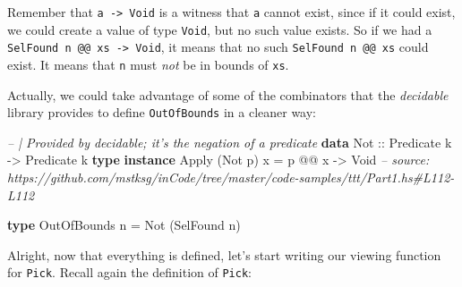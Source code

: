 \documentclass[]{article}
\newenvironment{Shaded}{}{}
\newcommand{\CommentTok}[1]{\textcolor[rgb]{0.38,0.63,0.69}{\textit{#1}}}
\newcommand{\DataTypeTok}[1]{\textcolor[rgb]{0.56,0.13,0.00}{#1}}
\newcommand{\FunctionTok}[1]{\textcolor[rgb]{0.02,0.16,0.49}{#1}}
\newcommand{\KeywordTok}[1]{\textcolor[rgb]{0.00,0.44,0.13}{\textbf{#1}}}
\newcommand{\NormalTok}[1]{#1}
\newcommand{\OtherTok}[1]{\textcolor[rgb]{0.00,0.44,0.13}{#1}}
\begin{document}
Remember that \texttt{a\ -\textgreater{}\ Void} is a witness that \texttt{a}
cannot exist, since if it could exist, we could create a value of type
\texttt{Void}, but no such value exists. So if we had a
\texttt{SelFound\ n\ @@\ xs\ -\textgreater{}\ Void}, it means that no such
\texttt{SelFound\ n\ @@\ xs} could exist. It means that \texttt{n} must
\emph{not} be in bounds of \texttt{xs}.

Actually, we could take advantage of some of the combinators that the
\emph{decidable} library provides to define \texttt{OutOfBounds} in a cleaner
way:

\begin{Shaded}
\begin{Highlighting}[]
\CommentTok{-- | Provided by decidable; it's the negation of a predicate}
\KeywordTok{data} \DataTypeTok{Not}\OtherTok{ ::} \DataTypeTok{Predicate}\NormalTok{ k }\OtherTok{->} \DataTypeTok{Predicate}\NormalTok{ k}
\KeywordTok{type} \KeywordTok{instance} \DataTypeTok{Apply}\NormalTok{ (}\DataTypeTok{Not}\NormalTok{ p) x }\FunctionTok{=}\NormalTok{ p }\FunctionTok{@@}\NormalTok{ x }\OtherTok{->} \DataTypeTok{Void}
\CommentTok{-- source: https://github.com/mstksg/inCode/tree/master/code-samples/ttt/Part1.hs#L112-L112}

\KeywordTok{type} \DataTypeTok{OutOfBounds}\NormalTok{ n }\FunctionTok{=} \DataTypeTok{Not}\NormalTok{ (}\DataTypeTok{SelFound}\NormalTok{ n)}
\end{Highlighting}
\end{Shaded}

Alright, now that everything is defined, let's start writing our viewing
function for \texttt{Pick}. Recall again the definition of \texttt{Pick}:
\end{document}
